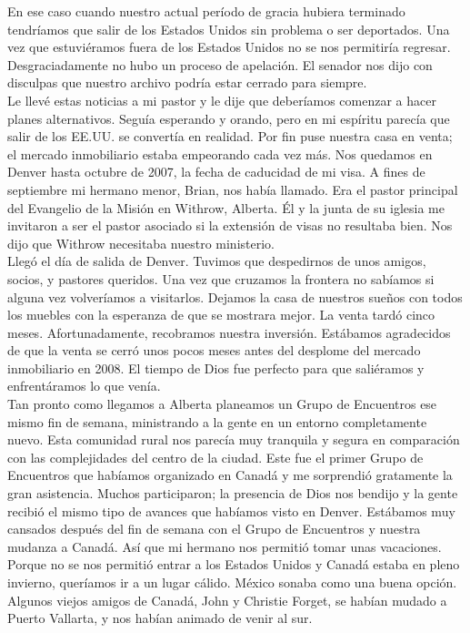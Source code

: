 \documentclass[twoside, 12pt]{book}
\begin{document}
En ese caso cuando nuestro actual período de gracia hubiera terminado tendríamos que salir de los Estados Unidos sin problema o ser deportados. Una vez que estuviéramos fuera de los Estados Unidos no se nos permitiría regresar.  Desgraciadamente no hubo un proceso de apelación. El senador nos dijo con disculpas que nuestro archivo podría estar cerrado para siempre.\\

Le llevé estas noticias a mi pastor y le dije que deberíamos comenzar a hacer planes alternativos.  Seguía esperando y orando, pero en mi espíritu parecía que salir de los EE.UU. se convertía en realidad. Por fin puse nuestra casa en venta; el mercado inmobiliario estaba empeorando cada vez más.  Nos quedamos en Denver hasta octubre de 2007, la fecha de caducidad de mi visa.  A fines de septiembre mi hermano menor, Brian, nos había llamado. Era el pastor principal del Evangelio de la Misión en Withrow, Alberta.  Él y la junta de su iglesia me invitaron a ser el pastor asociado si la extensión de visas no resultaba bien. Nos dijo que Withrow necesitaba nuestro ministerio.\\

Llegó el día de salida de Denver.  Tuvimos que despedirnos de unos amigos, socios, y pastores queridos. Una vez que cruzamos la frontera no sabíamos si alguna vez volveríamos a visitarlos. Dejamos la casa de nuestros sueños con todos los muebles con la esperanza de que se mostrara mejor. La venta tardó cinco meses. Afortunadamente, recobramos nuestra inversión. Estábamos agradecidos de que la venta se cerró unos pocos meses antes del desplome del mercado inmobiliario en 2008. El tiempo de Dios fue perfecto para que saliéramos y enfrentáramos lo que venía.\\

Tan pronto como llegamos a Alberta planeamos un Grupo de Encuentros ese mismo fin de semana, ministrando a la gente en un entorno completamente nuevo. Esta comunidad rural nos parecía muy tranquila y segura en comparación con las complejidades del centro de la ciudad. Este fue el primer Grupo de Encuentros que habíamos organizado en Canadá y me sorprendió gratamente la gran asistencia. Muchos participaron; la presencia de Dios nos bendijo y la gente recibió el mismo tipo de avances que habíamos visto en Denver.
Estábamos muy cansados después del fin de semana con el Grupo de Encuentros y nuestra mudanza a Canadá. Así que mi hermano nos permitió tomar unas vacaciones. Porque no se nos permitió entrar a los Estados Unidos y Canadá estaba en pleno invierno, queríamos ir a un lugar cálido. México sonaba como una buena opción. Algunos viejos amigos de Canadá, John y Christie Forget, se habían mudado a Puerto Vallarta, y nos habían animado de venir al sur.\\
\end{document}
